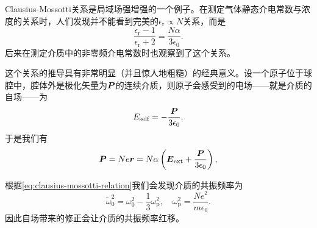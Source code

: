 Clausius-Mossotti关系是局域场强增强的一个例子。在测定气体静态介电常数与浓度的关系时，人们发现并不能看到完美的$\epsilon_\text{r} \propto N$关系，而是
\begin{equation}
    \frac{\epsilon_\text{r} - 1}{\epsilon_\text{r} + 2} = \frac{N \alpha}{3 \epsilon_0}.
    \label{eq:clausius-mossotti-relation}
\end{equation}
后来在测定介质中的非零频介电常数时也观察到了这个关系。

这个关系的推导具有非常明显（并且惊人地粗糙）的经典意义。设一个原子位于球腔中，腔体外是极化矢量为$\vb*{P}$的连续介质，则原子会感受到的电场——就是介质的自场——为
\[
    E_\text{self} = - \frac{\vb*{P}}{3 \epsilon_0}.
\]
于是我们有
\[
    \vb*{P} = N e \vb*{r} = N \alpha \left( \vb*{E}_\text{ext} + \frac{\vb*{P}}{3 \epsilon_0} \right),
\]

根据\eqref{eq:clausius-mossotti-relation}我们会发现介质的共振频率为
\begin{equation}
    \tilde{\omega}_0^2 = \omega_0^2 - \frac{1}{3} \omega_\text{p}^2, \quad \omega_\text{p}^2 = \frac{N e^2}{m \epsilon_0}.
\end{equation}
因此自场带来的修正会让介质的共振频率红移。
